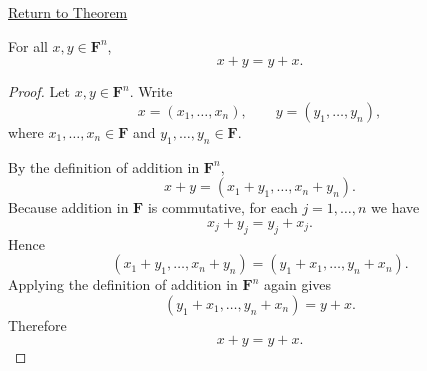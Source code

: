 \newpage
{}
\label{prf:addition-commutative-in-Fn}

\begin{remark*}[Return]
\hyperref[thm:addition-commutative-in-Fn]{Return to Theorem}
\end{remark*}

\begin{theorem*}
For all $x,y \in \mathbf{F}^n$,
\[
x+y=y+x.
\]
\end{theorem*}

\begin{proof}
Let $x,y \in \mathbf{F}^n$. Write
\[
x=(x_1,\dots,x_n),
\qquad
y=(y_1,\dots,y_n),
\]
where $x_1,\dots,x_n \in \mathbf{F}$ and $y_1,\dots,y_n \in \mathbf{F}$.

By the definition of addition in $\mathbf{F}^n$,
\[
x+y=(x_1+y_1,\dots,x_n+y_n).
\]
Because addition in $\mathbf{F}$ is commutative, for each $j=1,\dots,n$ we have
\[
x_j+y_j=y_j+x_j.
\]
Hence
\[
(x_1+y_1,\dots,x_n+y_n)=(y_1+x_1,\dots,y_n+x_n).
\]
Applying the definition of addition in $\mathbf{F}^n$ again gives
\[
(y_1+x_1,\dots,y_n+x_n)=y+x.
\]
Therefore
\[
x+y=y+x.
\]
\end{proof}